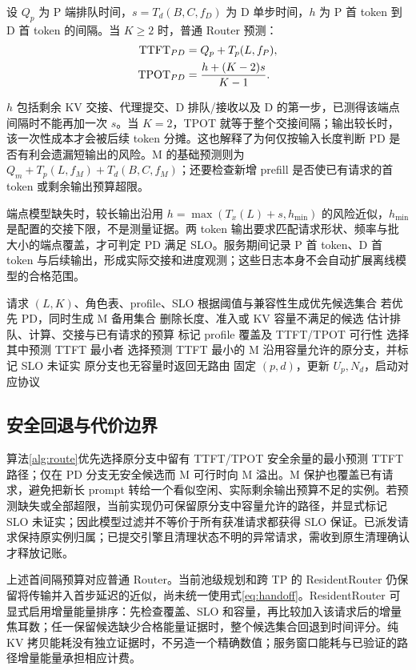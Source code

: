 \begin{samepage}
设 $Q_p$ 为 P 端排队时间，$s=T_d(B,C,f_D)$ 为 D 单步时间，$h$ 为 P 首 token 到 D 首 token 的间隔。当 $K\ge2$ 时，普通 Router 预测：
\begin{align}
 \mathrm{TTFT}_{PD}&=Q_p+T_p(L,f_P),\\
 \mathrm{TPOT}_{PD}&=\frac{h+(K-2)s}{K-1}.
 \label{eq:handoff}
\end{align}
\end{samepage}
$h$ 包括剩余 KV 交接、代理提交、D 排队/接收以及 D 的第一步，已测得该端点间隔时不能再加一次 $s$。当 $K=2$，TPOT 就等于整个交接间隔；输出较长时，该一次性成本才会被后续 token 分摊。这也解释了为何仅按输入长度判断 PD 是否有利会遗漏短输出的风险。M 的基础预测则为 $Q_m+T_p(L,f_M)+T_d(B,C,f_M)$；还要检查新增 prefill 是否使已有请求的首 token 或剩余输出预算超限。

端点模型缺失时，较长输出沿用 $h=\max(T_x(L)+s,h_{\min})$ 的风险近似，$h_{\min}$ 是配置的交接下限，不是测量证据。两 token 输出要求匹配请求形状、频率与批大小的端点覆盖，才可判定 PD 满足 SLO。服务期间记录 P 首 token、D 首 token 与后续输出，形成实际交接和进度观测；这些日志本身不会自动扩展离线模型的合格范围。

\begin{algorithm}[t]
\caption{普通 Router 的请求分配}
\label{alg:route}
\small
\begin{algorithmic}[1]
\Require 请求 $(L,K)$、角色表、profile、SLO
\State 根据阈值与兼容性生成优先候选集合
\State 若优先 PD，同时生成 M 备用集合
\State 删除长度、准入或 KV 容量不满足的候选
  \State 估计排队、计算、交接与已有请求的预算
  \State 标记 profile 覆盖及 TTFT/TPOT 可行性
\EndFor
{}
  \State 选择其中预测 TTFT 最小者
  \State 选择预测 TTFT 最小的 M
\Else
  \State 沿用容量允许的原分支，并标记 SLO 未证实
  \State 原分支也无容量时返回无路由
\EndIf
\State 固定 $(p,d)$，更新 $U_p,N_d$，启动对应协议
\end{algorithmic}
\end{algorithm}

\subsection{安全回退与代价边界}
算法\ref{alg:route}优先选择原分支中留有 TTFT/TPOT 安全余量的最小预测 TTFT 路径；仅在 PD 分支无安全候选而 M 可行时向 M 溢出。M 保护也覆盖已有请求，避免把新长 prompt 转给一个看似空闲、实际剩余输出预算不足的实例。若预测缺失或全部超限，当前实现仍可保留原分支中容量允许的路径，并显式标记 SLO 未证实；因此模型过滤并不等价于所有获准请求都获得 SLO 保证。已派发请求保持原实例归属；已提交引擎且清理状态不明的异常请求，需收到原生清理确认才释放记账。

上述首间隔预算对应普通 Router。当前池级规划和跨 TP 的 ResidentRouter 仍保留将传输并入首步延迟的近似，尚未统一使用式\eqref{eq:handoff}。ResidentRouter 可显式启用增量能量排序：先检查覆盖、SLO 和容量，再比较加入该请求后的增量焦耳数；任一保留候选缺少合格能量证据时，整个候选集合回退到时间评分。纯 KV 拷贝能耗没有独立证据时，不另造一个精确数值；服务窗口能耗与已验证的路径增量能量承担相应计费。
